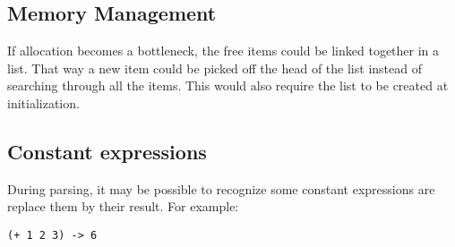 \documentclass[10pt, openany]{book}
\begin{document}
\subsection{Memory Management}
If allocation becomes a bottleneck, the free items could be linked together in a list.  That way a new item could be picked off the head of the list instead of searching through all the items.  This would also require the list to be created at initialization.

\subsection{Constant expressions}
During parsing, it may be possible to recognize some constant expressions are replace them by their result.  For example:
\lstset{language=[Tiny]Lisp}
\begin{lstlisting}
(+ 1 2 3) -> 6
\end{lstlisting}
\end{document}
